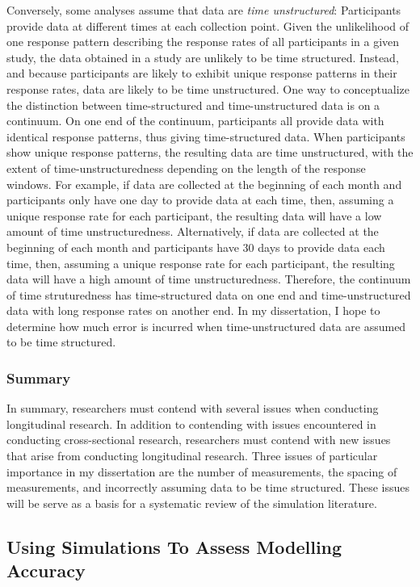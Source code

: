 \documentclass[
  english,
  man,floatsintext]{apa7}
\begin{document}
Conversely, some analyses assume that data are \emph{time unstructured}: Participants provide data at different times at each collection point. Given the unlikelihood of one response pattern describing the response rates of all participants in a given study, the data
obtained in a study are unlikely to be time structured. Instead, and because participants are likely to exhibit unique response
patterns in their response rates, data are likely to be time unstructured. One way to conceptualize the distinction between time-structured and time-unstructured data is on a continuum. On one end of the continuum, participants all provide data with identical response patterns, thus giving time-structured data. When participants show unique response patterns, the resulting data are time unstructured, with the extent of time-unstructuredness depending on the length of the response windows. For example, if data are collected at the beginning of each month and participants only have one day to provide data at each time, then, assuming a unique response rate for each participant, the resulting data will have a low amount of time unstructuredness. Alternatively, if data are collected at the beginning of each month and participants have 30 days to provide data each time, then, assuming a unique response rate for each participant, the resulting data will have a high amount of time unstructuredness. Therefore, the continuum of time struturedness has time-structured data on one end and time-unstructured data with long response rates on another end. In my dissertation, I hope to determine how much error is incurred when time-unstructured data are assumed to be time structured.

\hypertarget{summary}{%
\subsubsection{Summary}\label{summary}}

In summary, researchers must contend with several issues when conducting longitudinal research. In addition to contending with issues encountered in conducting cross-sectional research, researchers must contend with new issues that arise from conducting longitudinal research. Three issues of particular importance in my dissertation are the number of measurements, the spacing of measurements, and incorrectly assuming data to be time structured. These issues will be serve as a basis for a systematic review of the simulation literature.

\hypertarget{using-simulations-to-assess-modelling-accuracy}{%
\subsection{Using Simulations To Assess Modelling Accuracy}\label{using-simulations-to-assess-modelling-accuracy}}
\end{document}
